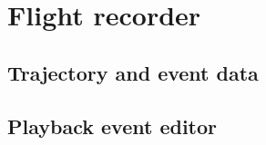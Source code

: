 \documentclass[Orbiter User Manual.tex]{subfiles}
\begin{document}
\section{Flight recorder}

\subsection{Trajectory and event data}

\subsection{Playback event editor}
\end{document}
